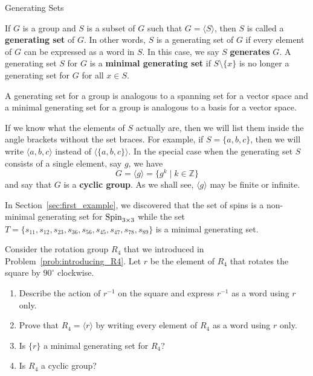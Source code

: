 \begin{section}{Generating Sets}
\begin{definition}
If $G$ is a group and $S$ is a subset of $G$ such that $G=\langle S\rangle$, then $S$ is called a \textbf{generating set} of $G$. In other words, $S$ is a generating set of $G$ if every element of $G$ can be expressed as a word in $S$.  In this case, we say $S$ \textbf{generates} $G$.  A generating set $S$ for $G$ is a \textbf{minimal generating set} if $S\setminus\{x\}$ is no longer a generating set for $G$ for all $x\in S$.
\end{definition}

A generating set for a group is analogous to a spanning set for a vector space and a minimal generating set for a group is analogous to a basis for a vector space.  

If we know what the elements of $S$ actually are, then we will list them inside the angle brackets without the set braces.  For example, if $S=\{a,b,c\}$, then we will write $\langle a, b, c\rangle$ instead of $\langle \{a,b,c\}\rangle$. In the special case when the generating set $S$ consists of a single element, say $g$, we have
\[
G=\langle g\rangle =\{g^k\mid k\in\mathbb{Z}\}
\]
and say that $G$ is a \textbf{cyclic group}.  As we shall see, $\langle g\rangle$ may be finite or infinite. 

\begin{example}
In Section~\ref{sec:first_example}, we discovered that the set of spins is a non-minimal generating set for $\operatorname{Spin}_{3\times 3}$ while the set $T=\{s_{11}, s_{12}, s_{23}, s_{36}, s_{56}, s_{45}, s_{47}, s_{78}, s_{89}\}$ is a minimal generating set.
\end{example}

\begin{problem}
Consider the rotation group $R_4$ that we introduced in Problem~\ref{prob:introducing_R4}. Let $r$ be the element of $R_4$ that rotates the square by $90^\circ$ clockwise. 
\begin{enumerate}[label=\textrm{(\alph*)}]
\item Describe the action of $r^{-1}$ on the square and express $r^{-1}$ as a word using $r$ only.
\item Prove that $R_4=\langle r\rangle$ by writing every element of $R_4$ as a word using $r$ only.
\item Is $\{r\}$ a minimal generating set for $R_4$?
\item Is $R_4$ a cyclic group?
\end{enumerate}
\end{problem}


\end{section}
